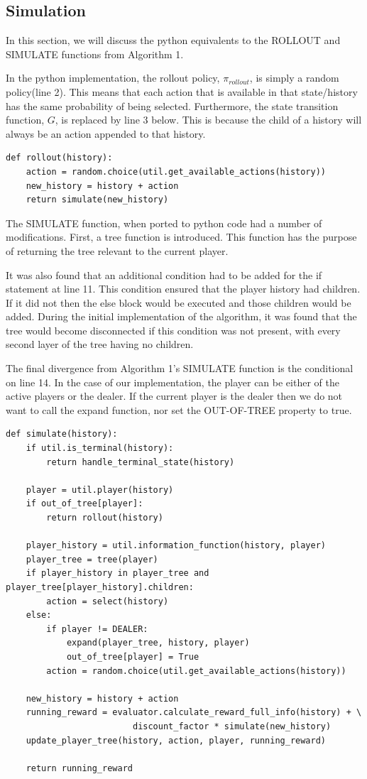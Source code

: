 \subsection{Simulation}\label{subsec:simulation}
In this section, we will discuss the python equivalents to the ROLLOUT and SIMULATE functions from Algorithm 1.

In the python implementation, the rollout policy, $\pi_{rollout}$, is simply a random policy(line 2).
This means that each action that is available in that state/history has the same probability of being selected.
Furthermore, the state transition function, $G$, is replaced by line 3 below.
This is because the child of a history will always be an action appended to that history.

\begin{lstlisting}[style=Python]
    def rollout(history):
    action = random.choice(util.get_available_actions(history))
    new_history = history + action
    return simulate(new_history)
\end{lstlisting}

The SIMULATE function, when ported to python code had a number of modifications.
First, a tree function is introduced.
This function has the purpose of returning the tree relevant to the current player.

It was also found that an additional condition had to be added for the if statement at line 11.
This condition ensured that the player history had children.
If it did not then the else block would be executed and those children would be added.
During the initial implementation of the algorithm, it was found that the tree would become
disconnected if this condition was not present, with every second layer of the tree having no children.

The final divergence from Algorithm 1's SIMULATE function is the conditional on line 14.
In the case of our implementation, the player can be either of the active players or the dealer.
If the current player is the dealer then we do not want to call the expand function,
nor set the OUT-OF-TREE property to true.

\begin{lstlisting}[style=Python]
def simulate(history):
    if util.is_terminal(history):
        return handle_terminal_state(history)

    player = util.player(history)
    if out_of_tree[player]:
        return rollout(history)

    player_history = util.information_function(history, player)
    player_tree = tree(player)
    if player_history in player_tree and player_tree[player_history].children:
        action = select(history)
    else:
        if player != DEALER:
            expand(player_tree, history, player)
            out_of_tree[player] = True
        action = random.choice(util.get_available_actions(history))

    new_history = history + action
    running_reward = evaluator.calculate_reward_full_info(history) + \
                         discount_factor * simulate(new_history)
    update_player_tree(history, action, player, running_reward)

    return running_reward
\end{lstlisting}


